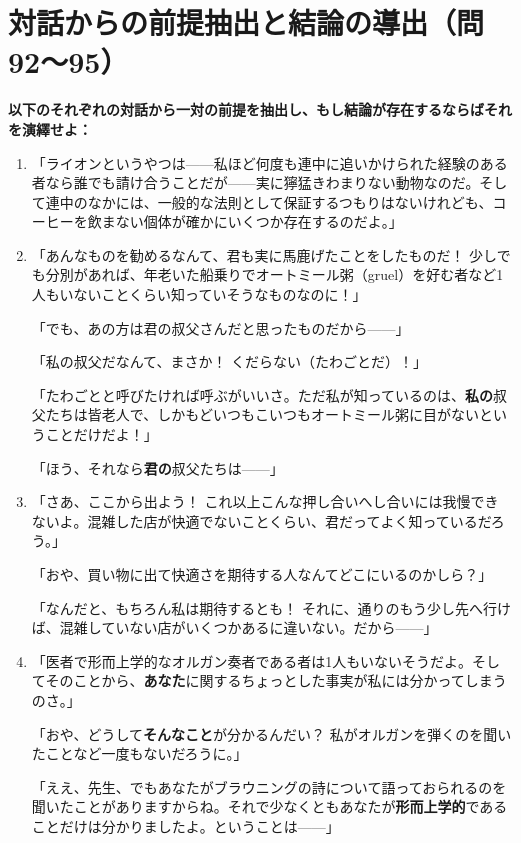 \documentclass[a4paper,11pt,openany]{ltjsbook}
\begin{document}
\vspace{4mm}
\section*{対話からの前提抽出と結論の導出（問92〜95）}
\noindent\textbf{以下のそれぞれの対話から一対の前提を抽出し、もし結論が存在するならばそれを演繹せよ：}

\begin{enumerate}[label=\textbf{\arabic*.}, start=92]
\item 「ライオンというやつは——私ほど何度も連中に追いかけられた経験のある者なら誰でも請け合うことだが——実に獰猛きわまりない動物なのだ。そして連中のなかには、一般的な法則として保証するつもりはないけれども、コーヒーを飲まない個体が確かにいくつか存在するのだよ。」
\item 「あんなものを勧めるなんて、君も実に馬鹿げたことをしたものだ！ 少しでも分別があれば、年老いた船乗りでオートミール粥（gruel）を好む者など1人もいないことくらい知っていそうなものなのに！」

「でも、あの方は君の叔父さんだと思ったものだから——」

「私の叔父だなんて、まさか！ くだらない（たわごとだ）！」

「たわごとと呼びたければ呼ぶがいいさ。ただ私が知っているのは、\textbf{私の}叔父たちは皆老人で、しかもどいつもこいつもオートミール粥に目がないということだけだよ！」

「ほう、それなら\textbf{君の}叔父たちは——」
\item 「さあ、ここから出よう！ これ以上こんな押し合いへし合いには我慢できないよ。混雑した店が快適でないことくらい、君だってよく知っているだろう。」

「おや、買い物に出て快適さを期待する人なんてどこにいるのかしら？」

「なんだと、もちろん私は期待するとも！ それに、通りのもう少し先へ行けば、混雑していない店がいくつかあるに違いない。だから——」
\item 「医者で形而上学的なオルガン奏者である者は1人もいないそうだよ。そしてそのことから、\textbf{あなた}に関するちょっとした事実が私には分かってしまうのさ。」

「おや、どうして\textbf{そんなこと}が分かるんだい？ 私がオルガンを弾くのを聞いたことなど一度もないだろうに。」

「ええ、先生、でもあなたがブラウニングの詩について語っておられるのを聞いたことがありますからね。それで少なくともあなたが\textbf{形而上学的}であることだけは分かりましたよ。ということは——」
\end{enumerate}
\end{document}
